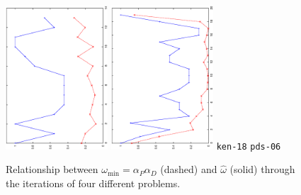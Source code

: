 \begin{figure}[ht]
  \vspace{-2ex}
  \includegraphics[width=0.34\textwidth,angle=-90]{figures/ken-18.eps}
  \includegraphics[width=0.34\textwidth,angle=-90]{figures/pds-06.eps}
  {\tt \scriptsize ken-18} \hspace{14em} {\tt \scriptsize pds-06}
\caption{Relationship between $\omega_{\min}=\alpha_P\alpha_D$ (dashed)
         and $\hat\omega$ (solid) through the iterations of four different
	 problems.}
\label{fig:alpha2omega}
\end{figure}

